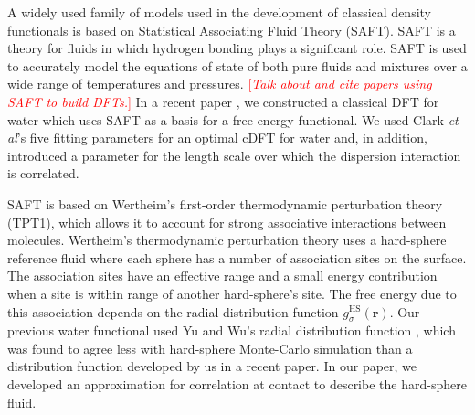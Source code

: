 \documentclass[twocolumn,amsmath,amssymb,prl]{revtex4-1}
\newcommand{\rr}{\textbf{r}}
\newcommand{\fixme}[1]{\textcolor{red}{[\emph{#1}]}}
\begin{document}

A widely used family of models used in the development of classical
density functionals is based on Statistical Associating Fluid Theory
(SAFT).
%
SAFT is a theory for fluids in which hydrogen bonding plays a significant
role\cite{chapman1989saft, muller2001molecular}. SAFT is used to
accurately model the equations of state of both pure fluids and
mixtures over a wide range of temperatures and pressures.
\fixme{Talk about and cite papers using SAFT to build DFTs.}
%
In a recent paper \cite{hughes2013classical}, we constructed a
classical DFT for water which uses SAFT as a basis for a free energy
functional. We used Clark \emph{et al}'s \cite{clark2006developing}
five fitting parameters for an optimal cDFT for water and, in
addition, introduced a parameter for the length scale over which the
dispersion interaction is correlated.

SAFT is based on Wertheim's first-order thermodynamic perturbation
theory (TPT1)\cite{wertheim1984fluidsI, wertheim1984fluidsII,
  wertheim1986fluidsIII, wertheim1986fluidsIV}, which allows it to
account for strong associative interactions between
molecules. Wertheim's thermodynamic perturbation theory uses a
hard-sphere reference fluid where each sphere has a number of
association sites on the surface. The association sites have an
effective range and a small energy contribution when a site is within
range of another hard-sphere's site. The free energy due to this
association depends on the radial distribution function
$g_\sigma^\text{HS}(\rr)$. Our previous water functional used Yu and
Wu's radial distribution function
\cite{yu2002fmt-dft-inhomogeneous-associating}, which was found to
agree less with hard-sphere Monte-Carlo simulation than a distribution
function developed by us in a recent paper.\cite{schulte2012using} In
our paper, we developed an approximation for correlation at
contact to describe the hard-sphere fluid.
\end{document}
